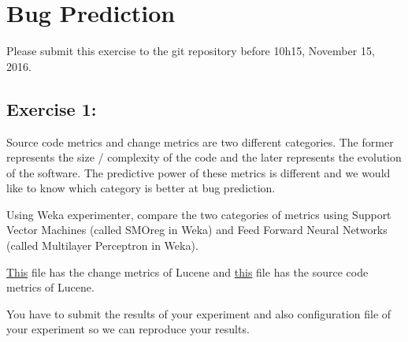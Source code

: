 \documentclass [11pt, a4wide, twoside]{article}
\begin{document}
\section*{Bug Prediction}


Please submit this exercise to the git repository before 10h15, November 15, 2016.

\subsection*{Exercise 1:}

Source code metrics and change metrics are two different categories. 
The former represents the size / complexity of the code and the later represents the evolution of the software. 
The predictive power of these metrics is different and we would like to know which category is better at bug prediction.

Using Weka experimenter, compare the two categories of metrics using Support Vector Machines (called SMOreg in Weka) and Feed Forward Neural Networks (called Multilayer Perceptron in Weka).

\href{https://dl.dropboxusercontent.com/u/28811625/SMA-Weka/Lucene-change-metrics.csv}{This} file has the change metrics of Lucene
and \href{https://dl.dropboxusercontent.com/u/28811625/SMA-Weka/Lucene-source-metrics.csv}{this} file has the source code metrics of Lucene.



You have to submit the results of your experiment and also configuration file of your experiment so we can reproduce your results.
\end{document}
